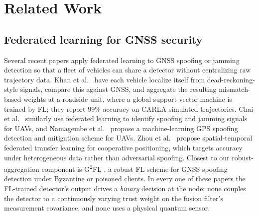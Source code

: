 \documentclass[12pt,a4paper]{article}
\begin{document}
\section{Related Work}
\label{sec:related}

\subsection{Federated learning for GNSS security}
Several recent papers apply federated learning to GNSS spoofing or jamming detection so that a fleet of vehicles can share a detector without centralizing raw trajectory data. Khan et al.\ \cite{khan2025enhancing} have each vehicle localize itself from dead-reckoning-style signals, compare this against GNSS, and aggregate the resulting mismatch-based weights at a roadside unit, where a global support-vector machine is trained by FL; they report 99\% accuracy on CARLA-simulated trajectories. Chai et al.\ \cite{chai2025navigation} similarly use federated learning to identify spoofing and jamming signals for UAVs, and Namagembe et al.\ \cite{namagembe2026machine} propose a machine-learning GPS spoofing detection and mitigation scheme for UAVs. Zhou et al.\ \cite{zhou2023spatiotemporal} propose spatial-temporal federated transfer learning for cooperative positioning, which targets accuracy under heterogeneous data rather than adversarial spoofing. Closest to our robust-aggregation component is G\textsuperscript{2}FL \cite{liu2026g2fl}, a robust FL scheme for GNSS spoofing detection under Byzantine or poisoned clients. In every one of these papers the FL-trained detector's output drives a \emph{binary} decision at the node; none couples the detector to a continuously varying trust weight on the fusion filter's measurement covariance, and none uses a physical quantum sensor.
\end{document}
